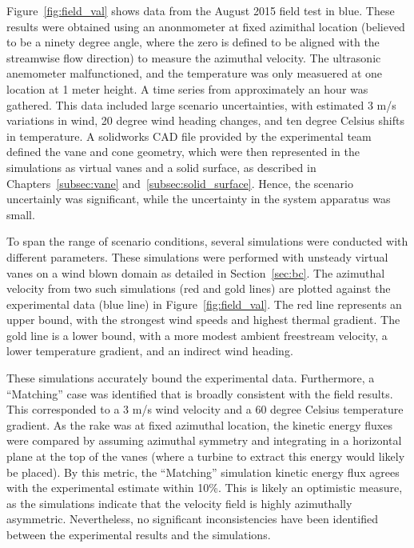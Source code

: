 Figure~\ref{fig:field_val} shows data from the August 2015 field test in
blue. These results were obtained using an anonmometer at fixed
azimithal location (believed to be a ninety degree angle, where the zero
is defined to be aligned with the streamwise flow direction) to measure the
azimuthal velocity. The ultrasonic anemometer malfunctioned, and the
temperature was only measuered at one location at 1 meter height. A time
series from approximately an hour was gathered. This data included large
scenario uncertainties, with estimated 3 m/s variations in wind, 20
degree wind heading changes, and ten degree Celsius shifts in
temperature. A solidworks CAD file provided by the experimental team
defined the vane and cone geometry, which were then represented in the
simulations as virtual vanes and a solid surface, as described in 
Chapters~\ref{subsec:vane} and~\ref{subsec:solid_surface}. Hence, the
scenario uncertainly was significant, while the uncertainty in the
system apparatus was small. 

To span the range of scenario conditions, several simulations were conducted
with different parameters. These simulations were performed with
unsteady virtual vanes on a wind blown domain as detailed in
Section~\ref{sec:bc}.  
The azimuthal velocity from two such
simulations (red and gold lines) are plotted against the experimental
data (blue line) in Figure~\ref{fig:field_val}. The red line represents
an upper bound, with the strongest wind speeds and highest thermal
gradient. The gold line is a lower bound, with a more modest ambient
freestream velocity, a lower temperature gradient, and an indirect wind
heading. 

These simulations accurately bound the experimental data. Furthermore, a
``Matching'' case was identified that is broadly consistent with the
field results. This corresponded to a 3 m/s wind velocity and a 60
degree Celsius temperature gradient. 
As the rake was at fixed azimuthal location, the kinetic energy fluxes were
compared by assuming azimuthal symmetry and integrating in a horizontal
plane at the top of the vanes (where a turbine to extract this energy
would likely be placed). By this metric, the ``Matching'' simulation
kinetic energy flux agrees with the experimental estimate within
10\%. This is likely an optimistic measure, as the simulations indicate
that the velocity field is highly azimuthally asymmetric. Nevertheless,
no significant inconsistencies have been identified between the
experimental results and the simulations. 

%
% 
%
% 
%
%
%
%
